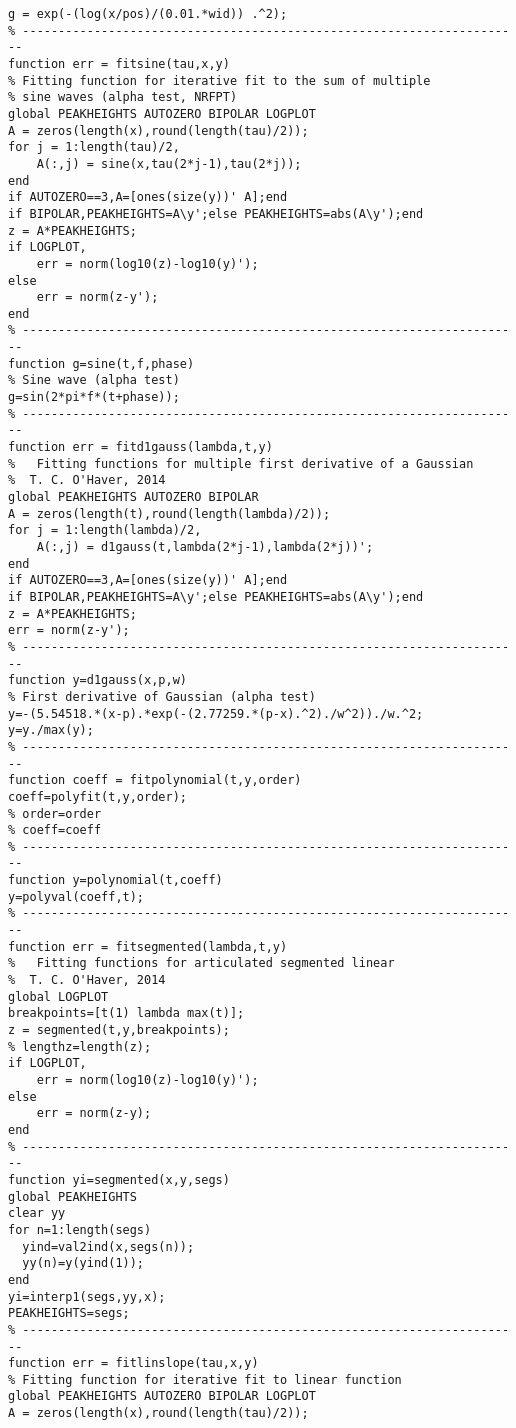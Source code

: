 \begin{lstlisting}
g = exp(-(log(x/pos)/(0.01.*wid)) .^2);
% ----------------------------------------------------------------------
function err = fitsine(tau,x,y)
% Fitting function for iterative fit to the sum of multiple
% sine waves (alpha test, NRFPT)
global PEAKHEIGHTS AUTOZERO BIPOLAR LOGPLOT
A = zeros(length(x),round(length(tau)/2));
for j = 1:length(tau)/2,
    A(:,j) = sine(x,tau(2*j-1),tau(2*j));
end
if AUTOZERO==3,A=[ones(size(y))' A];end
if BIPOLAR,PEAKHEIGHTS=A\y';else PEAKHEIGHTS=abs(A\y');end
z = A*PEAKHEIGHTS;
if LOGPLOT,
    err = norm(log10(z)-log10(y)');
else
    err = norm(z-y');
end
% ----------------------------------------------------------------------
function g=sine(t,f,phase) 
% Sine wave (alpha test)
g=sin(2*pi*f*(t+phase));
% ----------------------------------------------------------------------
function err = fitd1gauss(lambda,t,y)
%   Fitting functions for multiple first derivative of a Gaussian
%  T. C. O'Haver, 2014
global PEAKHEIGHTS AUTOZERO BIPOLAR
A = zeros(length(t),round(length(lambda)/2));
for j = 1:length(lambda)/2,
    A(:,j) = d1gauss(t,lambda(2*j-1),lambda(2*j))';
end
if AUTOZERO==3,A=[ones(size(y))' A];end
if BIPOLAR,PEAKHEIGHTS=A\y';else PEAKHEIGHTS=abs(A\y');end
z = A*PEAKHEIGHTS;
err = norm(z-y');
% ----------------------------------------------------------------------
function y=d1gauss(x,p,w)
% First derivative of Gaussian (alpha test)
y=-(5.54518.*(x-p).*exp(-(2.77259.*(p-x).^2)./w^2))./w.^2;
y=y./max(y);
% ----------------------------------------------------------------------
function coeff = fitpolynomial(t,y,order)
coeff=polyfit(t,y,order);
% order=order
% coeff=coeff
% ----------------------------------------------------------------------
function y=polynomial(t,coeff)
y=polyval(coeff,t);
% ----------------------------------------------------------------------
function err = fitsegmented(lambda,t,y)
%   Fitting functions for articulated segmented linear
%  T. C. O'Haver, 2014
global LOGPLOT
breakpoints=[t(1) lambda max(t)];
z = segmented(t,y,breakpoints);
% lengthz=length(z);
if LOGPLOT,
    err = norm(log10(z)-log10(y)');
else
    err = norm(z-y);
end
% ----------------------------------------------------------------------
function yi=segmented(x,y,segs)
global PEAKHEIGHTS
clear yy
for n=1:length(segs)
  yind=val2ind(x,segs(n));
  yy(n)=y(yind(1));
end
yi=interp1(segs,yy,x);
PEAKHEIGHTS=segs;
% ----------------------------------------------------------------------
function err = fitlinslope(tau,x,y)
% Fitting function for iterative fit to linear function
global PEAKHEIGHTS AUTOZERO BIPOLAR LOGPLOT
A = zeros(length(x),round(length(tau)/2));

\end{lstlisting}
